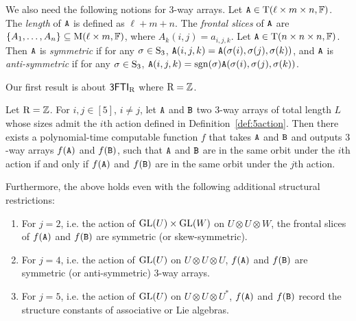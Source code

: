 We also need the following notions for $3$-way arrays. Let $\tA\in\T(\ell\times m\times n, \F)$. The \emph{length} of $\tA$ is defined as $\ell+m+n$.
The \emph{frontal slices} of $\tA$ are $\{A_1, \dots, A_n\}\subseteq\M(\ell\times m, \F)$, where $A_k(i,j)=a_{i,j,k}$.
Let $\tA\in\T(n\times n\times n, \F)$. Then $\tA$ is \emph{symmetric} if for any $\sigma\in\S_3$, $\tA(i,j,k)=\tA(\sigma(i), \sigma(j), \sigma(k))$, and $\tA$ is \emph{anti-symmetric} if for any $\sigma\in\S_3$, $\tA(i,j,k)=\sgn(\sigma)\tA(\sigma(i), \sigma(j), \sigma(k))$. 

Our first result is about $\ThreeFTI_\rng$ where $\rng=\Z$. 
\begin{theorem}\label{thm:Z-equivalence}
	Let $\rng=\Z$. For $i, j\in[5]$, $i\neq j$, let $\tA$ and $\tB$ two $3$-way arrays of total length $L$ whose sizes admit the $i$th action defined in Definition~\ref{def:5action}. Then there exists a polynomial-time computable function $f$ that takes $\tA$ and $\tB$ and outputs $3$-way arrays $f(\tA)$ and $f(\tB)$, such that $\tA$ and $\tB$ are in the same orbit under the $i$th action if and only if $f(\tA)$ and $f(\tB)$ are in the same orbit under the $j$th action.
	
	Furthermore, the above holds even with the following additional structural restrictions:
	\begin{enumerate}
		\item For $j=2$, i.e. the action of $\GL(U)\times \GL(W)$ on $U\otimes U\otimes W$, the frontal slices of $f(\tA)$ and $f(\tB)$ are symmetric (or skew-symmetric). 
		\item For $j=4$, i.e. the action of $\GL(U)$ on $U\otimes U\otimes U$, $f(\tA)$ and $f(\tB)$ are symmetric (or anti-symmetric) $3$-way arrays. 
		\item For $j=5$, i.e. the action of $\GL(U)$ on $U\otimes U\otimes U^*$, $f(\tA)$ and $f(\tB)$ record the structure constants of associative or Lie algebras. 
	\end{enumerate}
\end{theorem}

